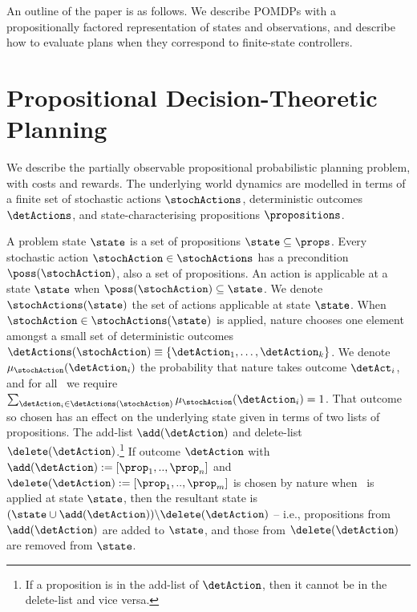 \documentclass[letterpaper]{article}
\begin{document}
An outline of the paper is as follows. We describe POMDPs with a
propositionally factored representation of states and observations,
and describe how to evaluate plans when they correspond to
finite-state controllers.

\section{Propositional Decision-Theoretic Planning}



We describe the partially observable propositional probabilistic
planning problem, with costs and rewards. The underlying world
dynamics are modelled in terms of a finite set of stochastic actions
$\stochActions$, deterministic outcomes $\detActions$, and
state-characterising propositions $\propositions$.  

A problem state $\state$ is a set of propositions $\state \subseteq
\props$. Every stochastic action $\stochAction \in \stochActions$ has
a precondition $\poss(\stochAction)$, also a set of propositions. An
action is applicable at a state $\state$ when $\poss(\stochAction)
\subseteq \state$. We denote $\stochActions(\state)$ the set of
actions applicable at state $\state$.  When $\stochAction \in
\stochActions(\state)$ is applied, nature chooses one element amongst
a small set of deterministic outcomes $\detActions(\stochAction)
\equiv \{\detAction_1, \ldots, \detAction_k \}$. We denote
$\mu_{\stochAction}(\detAction_i)$ the probability that nature takes
outcome $\detAct_i$, and for all \stochAction\ we require
$\sum_{\detAction_i \in \detActions(\stochAction)}
\mu_{\stochAction}(\detAction_i) = 1$. That outcome so chosen has an
effect on the underlying state given in terms of two lists of
propositions. The add-list $\add(\detAction)$ and delete-list
$\delete(\detAction)$.\footnote{If a proposition is in the add-list of
  $\detAction$, then it cannot be in the delete-list and vice versa.}
If outcome $\detAction$ with $\add(\detAction) := [\prop_1,
  ..,\prop_n]$ and $\delete(\detAction) := [\prop_1, ..,\prop_m]$ is
chosen by nature when \stochAction\ is applied at state $\state$, then
the resultant state is $ ( \state \cup \add(\detAction) ) \backslash
\delete(\detAction)$ -- i.e., propositions from $\add(\detAction)$ are
added to $\state$, and those from $\delete(\detAction)$ are removed
from $\state$.
\end{document}
